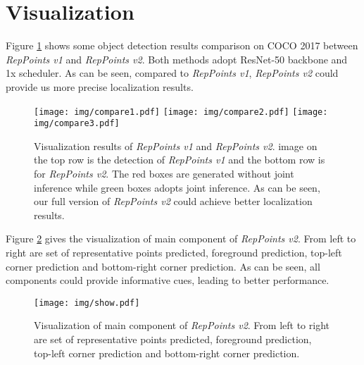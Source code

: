 \documentclass{article}
\begin{document}
\section{Visualization} \label{sec:visualization}

Figure \ref{fig:vis} shows some object detection results comparison on COCO 2017 \cite{MSCOCO} between \textit{RepPoints v1} \cite{yang19reppts} and \textit{RepPoints v2}. Both methods adopt ResNet-50 backbone and 1x scheduler. As can be seen, compared to \textit{RepPoints v1}, \textit{RepPoints v2} could provide us more precise localization results.

\begin{figure}
    \centering
    \texttt{[image: img/compare1.pdf]}
    \texttt{[image: img/compare2.pdf]}
    \texttt{[image: img/compare3.pdf]}
    \caption{Visualization results of \textit{RepPoints v1} and \textit{RepPoints v2}. image on the top row is the detection of \textit{RepPoints v1} and the bottom row is for \textit{RepPoints v2}. The red boxes are generated without joint inference while green boxes adopts joint inference. As can be seen, our full version of \textit{RepPoints v2} could achieve better localization results.}
    \label{fig:vis}
\end{figure}

Figure \ref{fig:detail} gives the visualization of main component of \textit{RepPoints v2}. From left to right are set of representative points predicted, foreground prediction, top-left corner prediction and bottom-right corner prediction. As can be seen, all components could provide informative cues, leading to better performance.

\begin{figure}
    \centering
    \texttt{[image: img/show.pdf]}
    \caption{Visualization of main component of \textit{RepPoints v2}. From left to right are set of representative points predicted, foreground prediction, top-left corner prediction and bottom-right corner prediction.}
    \label{fig:detail}
\end{figure}
\end{document}
